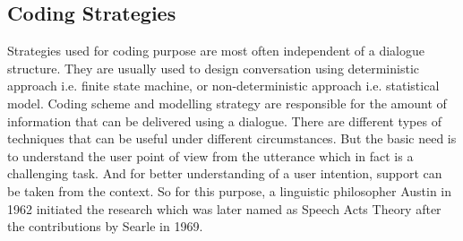 \subsection{Coding Strategies}
Strategies used for coding purpose are most often independent of a dialogue structure. They are usually used to design conversation using deterministic approach i.e. finite state machine, or non-deterministic approach i.e. statistical model. Coding scheme and modelling strategy are responsible for the amount of information that can be delivered using a dialogue. There are different types of techniques that can be useful under different circumstances. But the basic need is to understand the user point of view from the utterance which in fact is a challenging task. And for better understanding of a user intention, support can be taken from the context. So for this purpose, a linguistic philosopher Austin in 1962 initiated the research which was later named as Speech Acts Theory after the contributions by Searle in 1969. \cite{dialoguemanagementsystems}  

